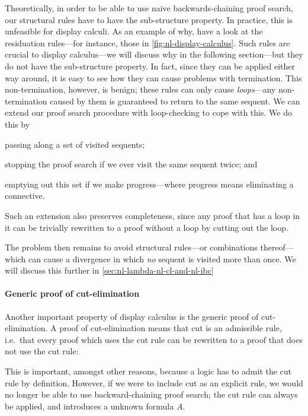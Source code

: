 Theoretically, in order to be able to use naive backwards-chaining
proof search, our structural rules have to have the sub-structure
property. In practice, this is unfeasible for display calculi.
As an example of why, have a look at the residuation rules---for
instance, those in \autoref{fig:nl-display-calculus}. Such rules are
crucial to display calculus---we will discuss why in the following
section---but they do not have the sub-structure property. In fact,
since they can be applied either way around, it is easy to see how
they can cause problems with termination.
This non-termination, however, is benign; these rules can only cause
\emph{loops}---any non-termination caused by them is guaranteed to
return to the same sequent.
We can extend our proof search procedure with loop-checking to cope
with this. We do this by
\begin{enumerate*}[label=(\arabic*)]
\item passing along a set of visited sequents;
\item stopping the proof search if we ever visit the same sequent
  twice; and
\item emptying out this set if we make progress---where progress means
  eliminating a connective.
\end{enumerate*}
Such an extension also preserves completeness, since any proof that
has a loop in it can be trivially rewritten to a proof without a loop by
cutting out the loop.

The problem then remains to avoid structural rules---or combinations
thereof---which can cause a divergence in which \emph{no} sequent is
visited more than once. We will discuss this further in
\autoref{sec:nl-lambda-nl-cl-and-nl-ibc}

\paragraph{Generic proof of cut-elimination}
Another important property of display calculus is the generic proof of
cut-elimination.
A proof of cut-elimination means that cut is an admissible rule, i.e.\
that every proof which uses the cut rule can be rewritten to a proof
that does not use the cut rule:
\begin{prooftree}
\end{prooftree}
This is important, amongst other reasons, because a logic has to admit
the cut rule by definition. However, if we were to include cut as an
explicit rule, we would no longer be able to use backward-chaining
proof search; the cut rule can always be applied, and introduces a
unknown formula $A$.

